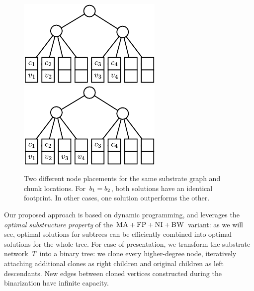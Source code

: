 \begin{figure}
  \centering
\includegraphics[width = 0.39\columnwidth]{figs/static-mapping/dynamic_bad}
\hspace{1cm}
\centering
\includegraphics[width = 0.39\columnwidth]{figs/static-mapping/dynamic_good}
\caption{Two different node placements for the same substrate graph and chunk
locations. For~$b_1 = b_2$, both solutions have an identical
footprint. In other cases, one solution outperforms the other.}
\label{fig:dynamic_motivation}
\vspace{-1em}
\end{figure}



 Our proposed approach is based on dynamic programming, and
leverages the \emph{optimal substructure property} of the $\textsc{MA}+\textsc{FP}+\textsc{NI}+\textsc{BW}$ variant:
as we will see, optimal solutions for subtrees
can be efficiently combined into optimal solutions for the whole tree.
For ease of presentation, we transform the
substrate network~$T$
into a binary tree:
we clone every higher-degree node,
iteratively attaching additional clones as right children
and original children as left descendants.
New edges between cloned vertices constructed during the binarization have infinite capacity.

